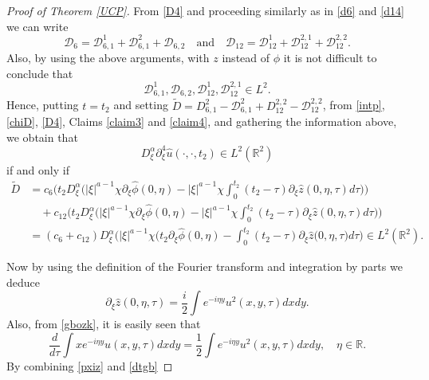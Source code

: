 \documentclass[reqno]{amsart}
\newcommand{\ha}{\hat{\phi}}
\newcommand{\dt}{D^{\alpha}_\xi}
\newcommand{\R}{\mathbb R}
\newcommand{\p}{\partial}
\numberwithin{equation}{section}
\begin{document}
\begin{proof}[Proof of Theorem \ref{UCP}]
From \eqref{D4} and proceeding similarly as in \eqref{d6} and \eqref{d14} we can write
\begin{equation*}
\mathcal D_{6}=\mathcal D_{6,1}^1+\mathcal D_{6,1}^2+\mathcal D_{6,2} \quad \mbox{and} \quad \mathcal D_{12}=\mathcal D_{12}^1+\mathcal D_{12}^{2,1}+\mathcal D_{12}^{2,2}.
\end{equation*}
Also, by using the above arguments, with $z$ instead of $\phi$ it is not difficult to  conclude that
 $$\mathcal D_{6,1}^1, \mathcal D_{6,2}, \mathcal D_{12}^1, \mathcal D_{12}^{2,1}\in L^2 .$$
Hence, putting $t=t_2$ and setting $\tilde{D}=D_{6,1}^2-\mathcal{D}_{6,1}^2+D_{12}^{2,2}-\mathcal{D}_{12}^{2,2}$, from \eqref{intp}, \eqref{chiD}, \eqref{D4}, Claims \ref{claim3} and \ref{claim4}, and gathering the information above, we obtain that
\begin{equation*}
D_{\xi}^{\alpha}\p_\xi^4 \hat{u}(\cdot,\cdot,t_2)\in L^2 (\R^2)
\end{equation*}
if and only if
\begin{equation}
\begin{split}\label{tD}
\tilde{D}&=c_6\Big(t_2\dt\Big(|\xi|^{a-1}\chi\p_\xi \ha(0,\eta)-|\xi|^{a-1}\chi\int_0^{t_2} (t_2-\tau)\p_\xi \hat{z}(0,\eta,\tau)d\tau \Big)\Big)\\
&\quad+c_{12}\Big(t_2\dt\Big(|\xi|^{a-1}\chi\p_\xi \ha(0,\eta)-|\xi|^{a-1}\chi\int_0^{t_2} (t_2-\tau)\p_\xi \hat{z}(0,\eta,\tau)d\tau\Big)
\Big)\\
&=(c_6+c_{12})\dt \Big(|\xi|^{a-1}\chi\Big(t_2\p_\xi \ha(0,\eta)-\int_0^{t_2} (t_2-\tau)\p_\xi \hat{z}(0,\eta,\tau\Big)d\tau\Big)\in L^2(\R^2).
\end{split}
\end{equation}




Now by using the definition of the Fourier transform and integration by parts we deduce
\begin{equation}\label{pxiz}
\p_\xi \hat z (0,\eta,\tau)=\frac{i}{2}\int e^{-i\eta y}u^2(x,y,\tau)dxdy.
\end{equation}
Also, from \eqref{gbozk}, it is easily seen that
\begin{equation}\label{dtgb}
\frac{d}{d\tau}\int xe^{-i\eta y}u(x,y,\tau)dxdy=\frac12\int e^{-i\eta y}u^2(x,y,\tau)dxdy, \quad \eta\in\R.
\end{equation}
By combining  \eqref{pxiz} and \eqref{dtgb}


\end{proof}
\end{document}
